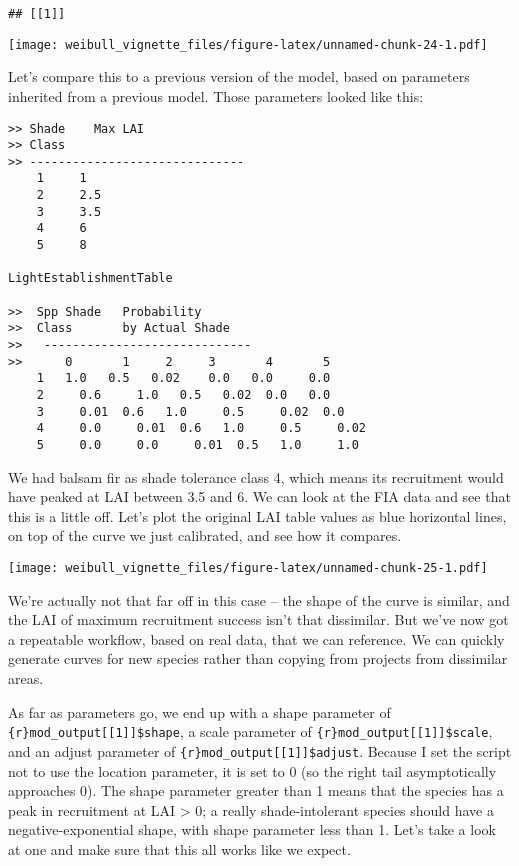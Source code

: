 \documentclass[
]{article}
\begin{document}
\begin{verbatim}
## [[1]]
\end{verbatim}

\texttt{[image: weibull\_vignette\_files/figure-latex/unnamed-chunk-24-1.pdf]}

Let's compare this to a previous version of the model, based on
parameters inherited from a previous model. Those parameters looked like
this:

\begin{verbatim}
>> Shade    Max LAI
>> Class    
>> ------------------------------   
    1     1 
    2     2.5 
    3     3.5 
    4     6
    5     8

LightEstablishmentTable 
                    
>>  Spp Shade   Probability                 
>>  Class       by Actual Shade                 
>>   -----------------------------                  
>>      0       1     2     3       4       5
    1   1.0   0.5   0.02    0.0   0.0     0.0
    2     0.6     1.0   0.5   0.02  0.0   0.0
    3     0.01  0.6   1.0     0.5     0.02  0.0
    4     0.0     0.01  0.6   1.0     0.5     0.02
    5     0.0     0.0     0.01  0.5   1.0     1.0
\end{verbatim}

We had balsam fir as shade tolerance class 4, which means its
recruitment would have peaked at LAI between 3.5 and 6. We can look at
the FIA data and see that this is a little off. Let's plot the original
LAI table values as blue horizontal lines, on top of the curve we just
calibrated, and see how it compares.

\texttt{[image: weibull\_vignette\_files/figure-latex/unnamed-chunk-25-1.pdf]}

We're actually not that far off in this case -- the shape of the curve
is similar, and the LAI of maximum recruitment success isn't that
dissimilar. But we've now got a repeatable workflow, based on real data,
that we can reference. We can quickly generate curves for new species
rather than copying from projects from dissimilar areas.

As far as parameters go, we end up with a shape parameter of
\texttt{\{r\}mod\_output{[}{[}1{]}{]}\$shape}, a scale parameter of
\texttt{\{r\}mod\_output{[}{[}1{]}{]}\$scale}, and an adjust parameter
of \texttt{\{r\}mod\_output{[}{[}1{]}{]}\$adjust}. Because I set the
script not to use the location parameter, it is set to 0 (so the right
tail asymptotically approaches 0). The shape parameter greater than 1
means that the species has a peak in recruitment at LAI \textgreater{}
0; a really shade-intolerant species should have a negative-exponential
shape, with shape parameter less than 1. Let's take a look at one and
make sure that this all works like we expect.
\end{document}

